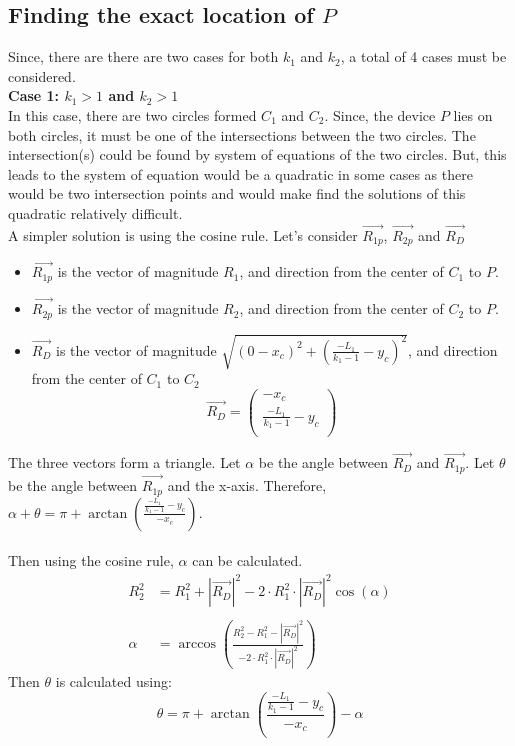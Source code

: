 \documentclass[a4paper,12pt]{article}
\begin{document}
\subsection{Finding the exact location of $P$}
Since, there are there are two cases for both $k_1$ and $k_2$, a total of 4 cases must be considered. \\
\textbf{Case 1: $k_1>1$ and $k_2>1$}\\
In this case, there are two circles formed $C_1$ and $C_2$. Since, the device $P$ lies on both circles, it must be one of the intersections between the two circles. The intersection(s) could be found by system of equations of the two circles.
But, this leads to the system of equation would be a quadratic in some cases as there would be two intersection points and would make find the solutions of this quadratic relatively difficult. 
\\
A simpler solution is using the cosine rule. Let's consider $\vec{R_{1p}}$, $\vec{R_{2p}}$ and $\vec{R_D}$
\begin{itemize}
    \item $\vec{R_{1p}}$ is the vector of magnitude $R_1$, and direction from the center of $C_1$ to $P$.
    \item $\vec{R_{2p}}$ is the vector of magnitude $R_2$, and direction from the center of $C_2$ to $P$. 
    \item $\vec{R_D}$ is the vector of magnitude $\sqrt{(0-x_c)^2 + \left(\frac{-L_1}{k_1-1}-y_c\right)^2}$, and direction from the center of $C_1$ to $C_2$
    \begin{equation*}
        \vec{R_D}=
        \begin{pmatrix}
            -x_c \\ 
            \frac{-L_1}{k_1-1}-y_c\\
        \end{pmatrix}
    \end{equation*}
\end{itemize}

The three vectors form a triangle. Let $\alpha$ be the angle between $\vec{R_D}$ and $\vec{R_{1p}}$. Let $\theta$ be the angle between $\vec{R_{1p}}$ and the x-axis. Therefore,
$\alpha + \theta = \pi + \arctan\left(\frac{\frac{-L_1}{k_1-1}-y_c}{-x_c}\right)$.
\\\\
Then using the cosine rule, $\alpha$ can be calculated.
\begin{equation*}
    \begin{split}
        R_2^2 & = R_1^2 + |\vec{R_D}|^2 - 2\cdot R_1^2\cdot|\vec{R_D}|^2\cos(\alpha)\\\\
        \alpha & = \arccos{\left(\frac{R_2^2 -R_1^2 - |\vec{R_D}|^2 }{- 2\cdot R_1^2\cdot|\vec{R_D}|^2}\right)}
    \end{split}
\end{equation*}
Then $\theta$ is calculated using:
\begin{equation*}
    \theta = \pi + \arctan{\left(\frac{\frac{-L_1}{k_1-1}-y_c}{-x_c}\right)} - \alpha
\end{equation*}
\end{document}
